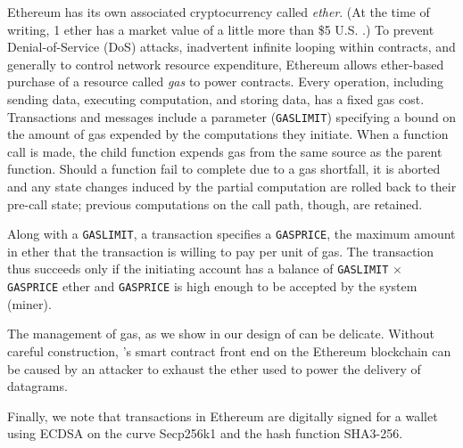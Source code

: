 Ethereum has its own associated cryptocurrency called \emph{ether}. (At the time of writing, 1 ether has a market value of a little more than \$5 U.S. \cite{ethprice}.)  To prevent Denial-of-Service (DoS) attacks, inadvertent infinite looping within contracts, and generally to control network resource expenditure,
Ethereum allows ether-based purchase of a resource called \emph{gas} to power contracts.
Every operation, including sending data, executing computation, and storing data, has a fixed gas cost.
Transactions and messages include a parameter (\texttt{GASLIMIT}) specifying a bound on the amount of gas expended by the computations they initiate.
When a function call is made, the child function expends gas from the same source as the parent function.
Should a function fail to complete due to a gas shortfall,
it is aborted and any state changes induced by the partial computation are rolled back to their pre-call state;
previous computations on the call path, though, are retained.

Along with a \texttt{GASLIMIT}, a transaction specifies a \texttt{GASPRICE}, the maximum amount in ether that the transaction is willing to pay per unit of gas. The transaction thus succeeds only if the initiating account has a balance of \texttt{GASLIMIT} $\times$ \texttt{GASPRICE} ether and \texttt{GASPRICE} is high enough to be accepted by the system (miner). 

The management of gas, as we show in our design of \tcs can be delicate. Without careful construction, \tc's smart contract front end on the Ethereum blockchain can be caused by an attacker to exhaust the ether used to power the delivery of datagrams.

Finally, we note that transactions in Ethereum are digitally signed for a wallet using ECDSA on the curve Secp256k1 and the hash function SHA3-256.



